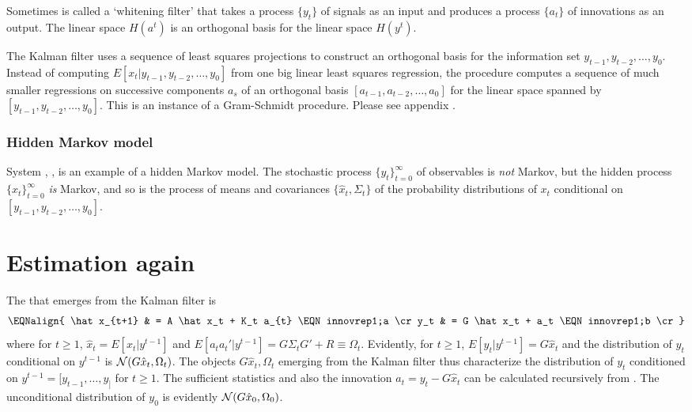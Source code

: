 Sometimes  is called a `whitening filter' that takes a  process $\{y_t\}$ of signals as an input and produces a process $\{a_t\}$ of
innovations as an output. The linear space $H(a^t)$ is an orthogonal basis for the linear space $H(y^t)$.

The Kalman filter  uses a sequence of least squares projections to  construct an orthogonal
basis for the information set $y_{t-1}, y_{t-2}, \ldots, y_0$.  Instead of computing $E [x_t | y_{t-1}, y_{t-2}, \ldots, y_0]$ from
one big linear least squares regression, the procedure  computes a sequence of much smaller regressions on successive components
$a_s$ of an orthogonal basis $[a_{t-1}, a_{t-2}, \ldots, a_0]$ for the linear space spanned by
$[y_{t-1}, y_{t-2}, \ldots, y_0]$. This is an instance of a  Gram-Schmidt procedure. Please see appendix .
%

\subsubsection{Hidden Markov model}

System  , ,  is an example of a hidden Markov model.  The stochastic process $\{y_t\}_{t=0}^\infty$ of observables is
{\it not\/} Markov,
 but the hidden
process $\{x_t\}_{t=0}^\infty$ {\it is\/} Markov, and so is the   process of means and covariances  $\{\hat x_t, \Sigma_t\}$
of the  probability distributions of   $x_t$ conditional on $[y_{t-1}, y_{t-2}, \ldots, y_0]$.
%



\section{Estimation again}\label{sec:estimation2}%
The  that emerges from the Kalman filter
is
$$ \EQNalign{ \hat x_{t+1} & = A \hat x_t + K_t a_{t} \EQN innovrep1;a \cr
            y_t & = G \hat x_t + a_t \EQN innovrep1;b \cr} $$
where for $t\geq 1$, $\hat x_t = E[x_t | y^{t-1}]$ and $E [a_t a_t'|y^{t-1}] = G \Sigma_t G' + R \equiv \Omega_t$.
Evidently, for $t \geq 1$,  $ E [y_t | y^{t-1}] = G \hat x_{t}$ and
the  distribution of $y_t$ conditional on $y^{t-1}$ is ${\cal N}(G \hat x_{t}, \Omega_t)$.  The objects
$G \hat x_{t}, \Omega_t$ emerging from the Kalman filter  thus characterize  the
distribution of $y_t$ conditioned on $y^{t-1}= [y_{t-1}, \ldots, y_]$ for $ t \geq 1$.  The sufficient statistics and also the innovation
$a_t = y_t - G \hat x_t$ can be calculated recursively from .  The unconditional distribution of
$y_0$ is evidently ${\cal N}(G \hat x_0, \Omega_0)$.

